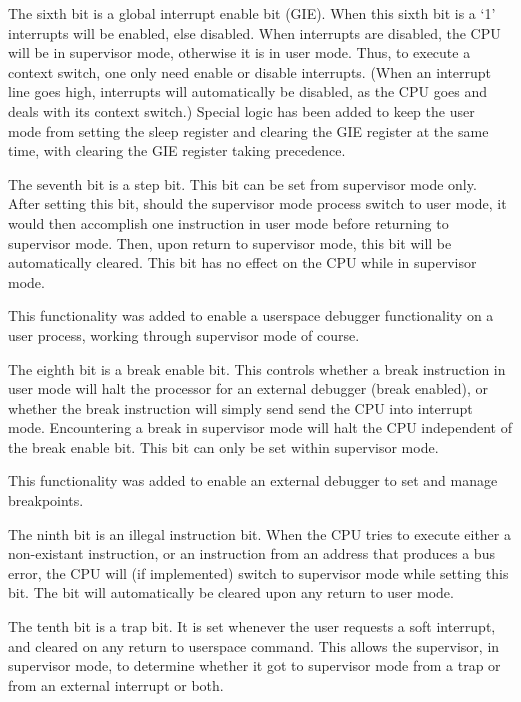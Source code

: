 \documentclass{gqtekspec}
\begin{document}
The sixth bit is a global interrupt enable bit (GIE).  When this
	sixth bit is a `1' interrupts will be enabled, else disabled.  When 
	interrupts are disabled, the CPU will be in supervisor mode, otherwise
	it is in user mode.  Thus, to execute a context switch, one only
	need enable or disable interrupts.  (When an interrupt line goes
	high, interrupts will automatically be disabled, as the CPU goes
	and deals with its context switch.)  Special logic has been added to
	keep the user mode from setting the sleep register and clearing the
	GIE register at the same time, with clearing the GIE register taking
	precedence.

The seventh bit is a step bit.  This bit can be set from supervisor mode only.
	After setting this bit, should the supervisor mode process switch to
	user mode, it would then accomplish one instruction in user mode
	before returning to supervisor mode.  Then, upon return to supervisor
	mode, this bit will be automatically cleared.  This bit has no effect
	on the CPU while in supervisor mode.

	This functionality was added to enable a userspace debugger
	functionality on a user process, working through supervisor mode
	of course.


The eighth bit is a break enable bit.  This controls whether a break
instruction in user mode will halt the processor for an external debugger
(break enabled), or whether the break instruction will simply send send the
CPU into interrupt mode.  Encountering a break in supervisor mode will
halt the CPU independent of the break enable bit.  This bit can only be set
within supervisor mode.

%

This functionality was added to enable an external debugger to
	set and manage breakpoints.

The ninth bit is an illegal instruction bit.  When the CPU
tries to execute either a non-existant instruction, or an instruction from
an address that produces a bus error, the CPU will (if implemented) switch
to supervisor mode while setting this bit.  The bit will automatically be
cleared upon any return to user mode.

The tenth bit is a trap bit.  It is set whenever the user requests a soft
interrupt, and cleared on any return to userspace command.  This allows the
supervisor, in supervisor mode, to determine whether it got to supervisor
mode from a trap or from an external interrupt or both.
\end{document}
